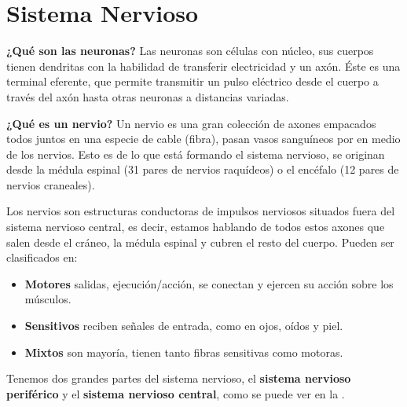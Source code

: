 \section{Sistema Nervioso}


\textbf{¿Qué son las neuronas?} 
Las neuronas son células con núcleo, sus cuerpos tienen dendritas con la habilidad de transferir electricidad y un axón.  Éste es una terminal eferente, que permite transmitir un pulso eléctrico desde el cuerpo a través del axón hasta otras neuronas a distancias variadas.


\textbf{¿Qué es un nervio?}
Un nervio es una gran colección de axones empacados todos juntos en una especie de cable (fibra), pasan vasos sanguíneos por en medio de los nervios. Esto es de lo que está formando el sistema nervioso, se originan desde la médula espinal (31 pares de nervios raquídeos) o el encéfalo (12 pares de nervios craneales).


Los nervios son estructuras conductoras de impulsos nerviosos situados fuera del sistema nervioso central, es decir, estamos hablando de todos estos axones que salen desde el cráneo, la médula espinal y cubren el resto del cuerpo.  Pueden ser clasificados en:


\begin{itemize}
\item \textbf{Motores} salidas, ejecución/acción, se conectan y ejercen su acción sobre los músculos.
\item \textbf{Sensitivos} reciben señales de entrada, como en ojos, oídos y piel.
\item \textbf{Mixtos} son mayoría, tienen tanto fibras sensitivas como motoras.
\end{itemize}




Tenemos dos grandes partes del sistema nervioso, el \textbf{sistema nervioso periférico} y el \textbf{sistema nervioso central}, como se puede ver en la . 


